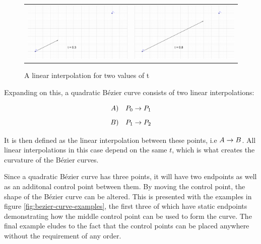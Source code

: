     \begin{figure}[H]
        \begin{tabular}{cc}
            \includegraphics[width=0.48\linewidth]{figures/theory/bezier_curves/linear_interpolation1.png} & 
            \includegraphics[width=0.48\linewidth]{figures/theory/bezier_curves/linear_interpolation2.png} \\
        \end{tabular}
        \caption{A linear interpolation for two values of t}
        \label{fig:linear-interpolation}
    \end{figure}
    
    Expanding on this, a quadratic Bézier curve consists of two linear interpolations:
    
    $$ A) \quad P_0 \rightarrow P_1 $$
    $$ B) \quad P_1 \rightarrow P_2 $$
    
    It is then defined as the linear interpolation between these points, i.e $ A \rightarrow B $. All linear interpolations in this case depend on the same $t$, which is what creates the curvature of the Bézier curves.

    Since a quadratic Bézier curve has three points, it will have two endpoints as well as an additonal control point between them. By moving the control point, the shape of the Bézier curve can be altered. This is presented with the examples in figure \ref{fig:bezier-curve-examples}, the first three of which have static endpoints demonstrating how the middle control point can be used to form the curve. The final example eludes to the fact that the control points can be placed anywhere without the requirement of any order.

